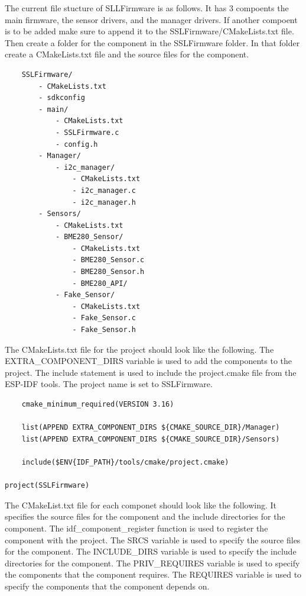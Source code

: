 \documentclass{book}
\begin{document}
\par The current file stucture of SLLFirmware is as follows. It has 3 compoents the main firmware, the sensor drivers, and the manager drivers. If another compoent is to be added make sure to append it to the SSLFirmware/CMakeLists.txt file. Then create a folder for the component in the SSLFirmware folder. In that folder create a CMakeLists.txt file and the source files for the component. 

\begin{verbatim}
    SSLFirmware/
        - CMakeLists.txt
        - sdkconfig
        - main/
            - CMakeLists.txt
            - SSLFirmware.c
            - config.h
        - Manager/
            - i2c_manager/
                - CMakeLists.txt
                - i2c_manager.c
                - i2c_manager.h
        - Sensors/
            - CMakeLists.txt
            - BME280_Sensor/
                - CMakeLists.txt
                - BME280_Sensor.c
                - BME280_Sensor.h
                - BME280_API/
            - Fake_Sensor/
                - CMakeLists.txt
                - Fake_Sensor.c
                - Fake_Sensor.h
    \end{verbatim}

\par The CMakeLists.txt file for the project should look like the following. The EXTRA\_COMPONENT\_DIRS variable is used to add the components to the project. The include statement is used to include the project.cmake file from the ESP-IDF tools. The project name is set to SSLFirmware.

\begin{verbatim}
    cmake_minimum_required(VERSION 3.16)

    list(APPEND EXTRA_COMPONENT_DIRS ${CMAKE_SOURCE_DIR}/Manager)
    list(APPEND EXTRA_COMPONENT_DIRS ${CMAKE_SOURCE_DIR}/Sensors)

    include($ENV{IDF_PATH}/tools/cmake/project.cmake)

project(SSLFirmware)
\end{verbatim}

\par The CMakeList.txt file for each componet should look like the following. It specifies the source files for the component and the include directories for the component. The idf\_component\_register function is used to register the component with the project. The SRCS variable is used to specify the source files for the component. The INCLUDE\_DIRS variable is used to specify the include directories for the component. The PRIV\_REQUIRES variable is used to specify the components that the component requires. The REQUIRES variable is used to specify the components that the component depends on. 
\end{document}
